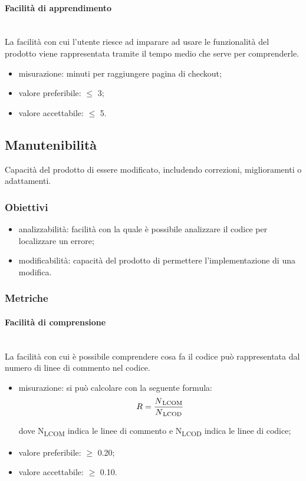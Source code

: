 			\paragraph{Facilità di apprendimento}\mbox{}\\
			La facilità con cui l'utente riesce ad imparare ad usare le funzionalità del prodotto viene rappresentata tramite il tempo medio che serve per comprenderle.
			\begin{itemize}
			\item misurazione: minuti per raggiungere pagina di checkout;
			\item valore preferibile: $\leq$ 3;
			\item valore accettabile: $\leq$ 5.
			\end{itemize}
		
	\subsection{Manutenibilità}
	Capacità del prodotto di essere modificato, includendo correzioni, miglioramenti o adattamenti.
		\subsubsection{Obiettivi}
		\begin{itemize}
			\item analizzabilità: facilità con la quale è possibile analizzare il codice per localizzare un errore;
			\item modificabilità: capacità del prodotto di permettere l'implementazione di una modifica.
		\end{itemize}
		\subsubsection{Metriche}
			\paragraph{Facilità di comprensione}\mbox{}\\
			La facilità con cui è possibile comprendere cosa fa il codice può rappresentata dal numero di linee di commento nel codice.
			\begin{itemize}
			\item misurazione: si può calcolare con la seguente formula: \\
			$$ R = \frac{N\textsubscript{LCOM}}{N\textsubscript{LCOD}}  $$
		
			dove N\textsubscript{LCOM} indica le linee di commento e N\textsubscript{LCOD} indica le linee di codice;
			\item valore preferibile: $\geq$ 0.20;
			\item valore accettabile: $\geq$ 0.10.
			\end{itemize}
